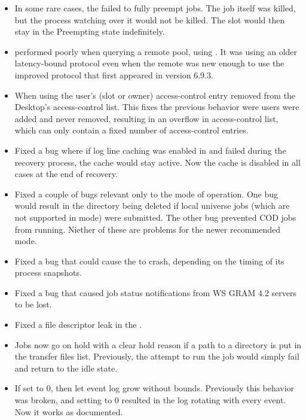 \begin{itemize}

\item In some rare cases, the  failed to fully preempt jobs.
The job itself was killed, but the  process watching over
it would not be killed.  The slot would then stay in the Preempting state
indefinitely.

\item {} performed poorly when querying a remote pool, using
.  It was using an older latency-bound protocol even when
the remote  was new enough to use the improved protocol
that first appeared in version 6.9.3.

\item When using  the user's (slot or owner)
access-control entry removed from the Desktop's access-control list.  This
fixes the previous behavior were users were added and never removed, 
resulting in an overflow in access-control list, which can only contain 
a fixed number of access-control entries.

\item Fixed a bug where if log line caching was enabled in 
and  failed during the recovery process, the cache would
stay active. Now the cache is disabled in all cases at the end of recovery.

\item Fixed a couple of bugs relevant only to the 
mode of operation. One bug would result in the  directory being
deleted if local universe jobs (which are not supported in
 mode) were submitted. The other bug prevented
COD jobs from running. Niether of these are problems for the newer
recommended  mode.

\item Fixed a bug that could cause the  to crash, depending
on the timing of its process snapshots.

\item Fixed a bug that caused job status notifications from WS GRAM 4.2
servers to be lost.

\item Fixed a file descriptor leak in the .

\item Jobs now go on hold with a clear hold reason if a path to a
directory is put in the transfer files list.  Previously, the attempt
to run the job would simply fail and return to the idle state.

\item If  set to 0, then let event log grow without 
  bounds.  Previously this behavior was broken, and setting
   to 0 resulted in the log rotating with every
  event.  Now it works as documented.

\end{itemize}

